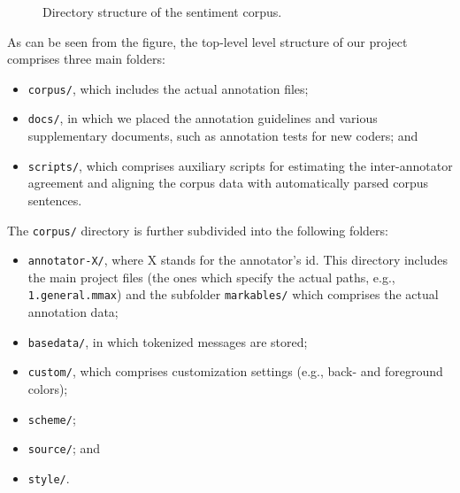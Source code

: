 \begin{figure}[hbt!]
  \tiny
\caption{Directory structure of the sentiment
  corpus.\label{fig:snt:corpus}}
\end{figure}
As can be seen from the figure, the top-level level structure of our
project comprises three main folders:
\begin{itemize}
  \item\texttt{corpus/}, which includes the actual annotation files;

  \item\texttt{docs/}, in which we placed the annotation guidelines
    and various supplementary documents, such as annotation tests for
    new coders; and

  \item\texttt{scripts/}, which comprises auxiliary scripts for
    estimating the inter-annotator agreement and aligning the corpus
    data with automatically parsed corpus sentences.
\end{itemize}
The \texttt{corpus/} directory is further subdivided into the
following folders:
\begin{itemize}
  \item\texttt{annotator-X/}, where X stands for the annotator's id.
    This directory includes the main project files (the ones which
    specify the actual paths, e.g., \texttt{1.general.mmax}) and the
    subfolder \texttt{markables/} which comprises the actual
    annotation data;

  \item\texttt{basedata/}, in which tokenized messages are stored;
  \item\texttt{custom/}, which comprises customization settings (e.g.,
    back- and foreground colors);
  \item\texttt{scheme/};
  \item\texttt{source/}; and
  \item\texttt{style/}.
\end{itemize}

